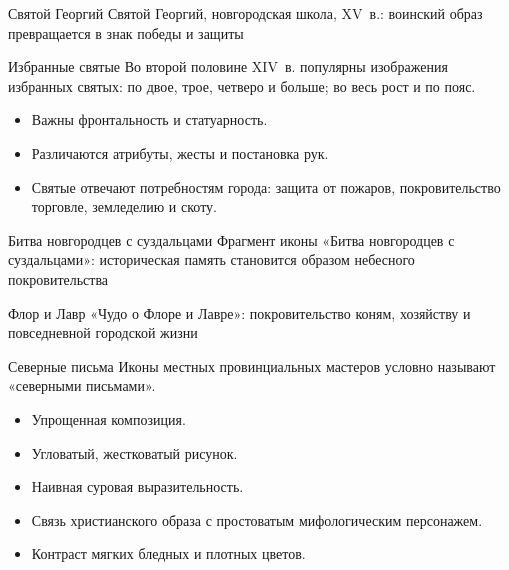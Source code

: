 \begin{frame}{Святой Георгий}
    {Святой Георгий, новгородская школа, XV~в.:
     воинский образ превращается в знак победы и защиты}
\end{frame}

\begin{frame}{Избранные святые}
  Во второй половине XIV~в. популярны изображения избранных святых:
  по двое, трое, четверо и больше; во весь рост и по пояс.

  \begin{itemize}
    \item Важны фронтальность и статуарность.
    \item Различаются атрибуты, жесты и постановка рук.
    \item Святые отвечают потребностям города:
          защита от пожаров, покровительство торговле,
          земледелию и скоту.
  \end{itemize}
\end{frame}

\begin{frame}{Битва новгородцев с суздальцами}
    {Фрагмент иконы «Битва новгородцев с суздальцами»:
     историческая память становится образом небесного покровительства}
\end{frame}

\begin{frame}{Флор и Лавр}
    {«Чудо о Флоре и Лавре»:
     покровительство коням, хозяйству и повседневной городской жизни}
\end{frame}

\begin{frame}{Северные письма}
  Иконы местных провинциальных мастеров условно называют
  «северными письмами».

  \begin{itemize}
    \item Упрощенная композиция.
    \item Угловатый, жестковатый рисунок.
    \item Наивная суровая выразительность.
    \item Связь христианского образа с простоватым
          мифологическим персонажем.
    \item Контраст мягких бледных и плотных цветов.
  \end{itemize}
\end{frame}

